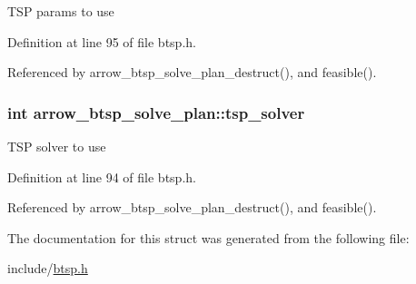 TSP params to use 

Definition at line 95 of file btsp.h.

Referenced by arrow\_\-btsp\_\-solve\_\-plan\_\-destruct(), and feasible().\hypertarget{structarrow__btsp__solve__plan_911facf12673ddb5c3eb024fa12ee18d}{
\subsubsection[{tsp\_\-solver}]{\setlength{\rightskip}{0pt plus 5cm}int {\bf arrow\_\-btsp\_\-solve\_\-plan::tsp\_\-solver}}}
\label{structarrow__btsp__solve__plan_911facf12673ddb5c3eb024fa12ee18d}


TSP solver to use 

Definition at line 94 of file btsp.h.

Referenced by arrow\_\-btsp\_\-solve\_\-plan\_\-destruct(), and feasible().

The documentation for this struct was generated from the following file:\begin{CompactItemize}
\item 
include/\hyperlink{btsp_8h}{btsp.h}\end{CompactItemize}
